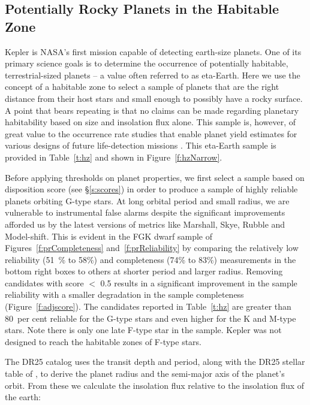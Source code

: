 \label{s:hz}
\subsection{Potentially Rocky Planets in the Habitable Zone}

Kepler is NASA's first mission capable of detecting earth-size planets.  One of its primary science goals is to determine the occurrence of potentially habitable, terrestrial-sized planets -- a value often referred to as eta-Earth.  Here we use the concept of a habitable zone to select a sample of planets that are the right distance from their host stars and small enough to possibly have a rocky surface. A point that bears repeating is that no claims can be made regarding planetary habitability based on size and insolation flux alone.   This sample is, however, of great value to the occurrence rate studies that enable planet yield estimates for various designs of future life-detection missions \citep{stark2015}. This eta-Earth sample is provided in Table~\ref{t:hz} and shown in Figure~\ref{f:hzNarrow}.


Before applying thresholds on planet properties, we first select a sample based on disposition score (see \S\ref{s:scores}) in order to produce a sample of highly reliable planets orbiting G-type stars. At long orbital period and small radius, we are vulnerable to instrumental false alarms despite the significant improvements afforded us by the latest versions of metrics like Marshall, Skye, Rubble and Model-shift. This is evident in the FGK dwarf sample of Figures~\ref{f:prCompleteness} and~\ref{f:prReliability} by comparing the relatively low reliability (51~\% to 58\%) and completeness (74\% to 83\%) measurements in the bottom right boxes to others at shorter period and larger radius.  Removing candidates with score $<$ 0.5 results in a significant improvement in the sample reliability with a smaller degradation in the sample completeness (Figure~\ref{f:adjscore}).  The candidates reported in Table~\ref{t:hz} are greater than 80~per cent reliable for the G-type stars and even higher for the K and M-type stars. Note there is only one late F-type star in the sample.  Kepler was not designed to reach the habitable zones of F-type stars.


The DR25 catalog uses the transit depth and period, along with the DR25 stellar table of \citet{Mathur2017ApJS}, to derive the planet radius and the semi-major axis of the planet's orbit.  From these we calculate the insolation flux relative to the insolation flux of the earth:

